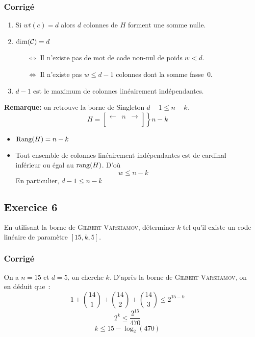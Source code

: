 \documentclass[a4paper,10pt,twocolumn]{article}
\theoremstyle{break}
\newcommand{\code}[1]{\mathcal{#1}}
\newcommand{\C}{\code{C}}
\begin{document}
\subsubsection*{Corrigé}

\begin{enumerate}
 \item Si $wt(c) = d$ alors $d$ colonnes de $H$ forment une somme nulle.
 \item ${\rm dim}(\C) = d$
  \begin{itemize}
    \item[$\Leftrightarrow$] Il n'existe pas de mot de code non-nul de poids $w < d$.\\
    \item[$\Leftrightarrow$] Il n'existe pas $w \le d - 1$ colonnes dont la somme fasse~0.
  \end{itemize}
 \item $d-1$ est le maximum de colonnes linéairement indépendantes.
\end{enumerate}
\textbf{Remarque:} on retrouve la borne de Singleton $d-1 \le n-k$.
$$ H = \left.\begin{bmatrix} \longleftarrow & n & \longrightarrow \\ & & \\ & & \end{bmatrix}\right\} n-k $$
\begin{itemize}
\item ${\rm Rang}(H) = n-k$
\item Tout ensemble de colonnes linéairement indépendantes est de cardinal inférieur ou égal au ${\rm rang}(H)$. 
	D'où $$ w \le n - k $$
	En particulier, $d-1 \le n-k$
\end{itemize}


\subsection*{Exercice 6}
En utilisant la borne de \textsc{Gilbert-Varshamov}, déterminer $k$ tel qu'il existe un code linéaire de paramètre $[15, k, 5]$.

\subsubsection*{Corrigé}

On a $n=15$ et $d = 5$, on cherche $k$. D'après la borne de \textsc{Gilbert-Varshamov}, on en déduit que~:
$$ 1 + {14 \choose 1} + {14 \choose 2} + {14 \choose 3} \le 2^{15 - k} $$
$$ 2^k \le \frac{2^15}{470} $$
$$ k \le 15 - \log_2(470) $$
\end{document}
